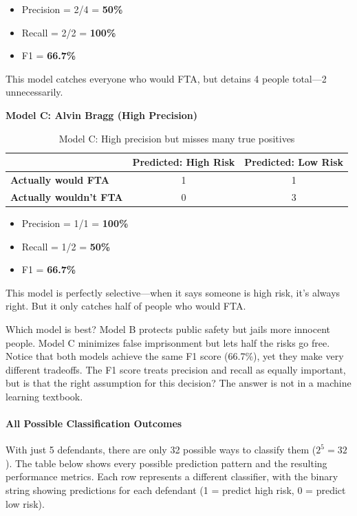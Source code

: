 \begin{itemize}
\item Precision = 2/4 = \textbf{50\%}
\item Recall = 2/2 = \textbf{100\%}
\item F1 = \textbf{66.7\%}
\end{itemize}

This model catches everyone who would FTA, but detains 4 people total—2 unnecessarily.

\textbf{Model C: Alvin Bragg (High Precision)}
\begin{table}[H]
\centering
\begin{tabular}{lcc}
\toprule
& \textbf{Predicted: High Risk} & \textbf{Predicted: Low Risk} \\
\midrule
\textbf{Actually would FTA} & 1 & 1 \\
\textbf{Actually wouldn't FTA} & 0 & 3 \\
\bottomrule
\end{tabular}
\caption{Model C: High precision but misses many true positives}
\label{tab:model-c-high-precision}
\end{table}

\begin{itemize}
\item Precision = 1/1 = \textbf{100\%}
\item Recall = 1/2 = \textbf{50\%}
\item F1 = \textbf{66.7\%}
\end{itemize}

This model is perfectly selective—when it says someone is high risk, it's always right. But it only catches half of people who would FTA.

Which model is best? Model B protects public safety but jails more innocent people. Model C minimizes false imprisonment but lets half the risks go free. Notice that both models achieve the same F1 score (66.7\%), yet they make very different tradeoffs. The F1 score treats precision and recall as equally important, but is that the right assumption for this decision? The answer is not in a machine learning textbook.

\paragraph{All Possible Classification Outcomes}

With just 5 defendants, there are only 32 possible ways to classify them ($2^5 = 32$). The table below shows every possible prediction pattern and the resulting performance metrics. Each row represents a different classifier, with the binary string showing predictions for each defendant (1 = predict high risk, 0 = predict low risk).

